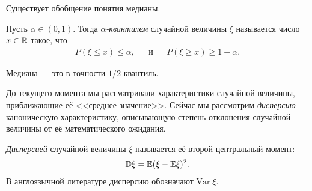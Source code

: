 \documentclass[../main.tex]{subfiles}
\begin{document}
Существует обобщение понятия медианы.

\begin{df*}
 Пусть $ \alpha \in (0,1) $. Тогда \textit{$ \alpha $-квантилем} случайной величины $ \xi $ называется число $ x \in \mathbb{R} $ такое, что
 \begin{align*}
  P(\xi \leqslant x) \leqslant \alpha, &&\text{и} &&P(\xi \geqslant x) \geqslant 1 - \alpha.
 \end{align*}
\end{df*}

Медиана --- это в точности $ 1 / 2 $-квантиль.

До текущего момента мы рассматривали характеристики случайной величины, приближающие её <<среднее значение>>. Сейчас мы рассмотрим \textit{дисперсию} --- каноническую характеристику, описывающую степень отклонения случайной величины от её математического ожидания.

\begin{df}[дисперсия]
 \textit{Дисперсией} случайной величины $ \xi $ называется её второй центральный момент:
 \begin{align*}
  \mathbb D \xi = \mathbb E (\xi - \mathbb E\xi)^{2}.
 \end{align*}
 В англоязычной литературе дисперсию обозначают $ \mathrm{Var} \;\xi $.
\end{df}
\end{document}

